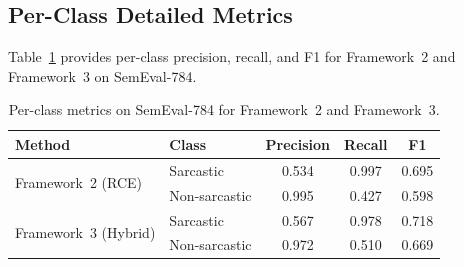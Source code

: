 \documentclass{article} %
\begin{document}
\subsection{Per-Class Detailed Metrics}

Table~\ref{tab:perclass} provides per-class precision, recall, and F1 for Framework~2 and Framework~3 on SemEval-784.

\begin{table}[h]
\centering
\small
\caption{Per-class metrics on SemEval-784 for Framework~2 and Framework~3.}
\label{tab:perclass}
\begin{tabular}{llccc}
\toprule
Method & Class & Precision & Recall & F1 \\
\midrule
\multirow{2}{*}{Framework~2 (RCE)}
    & Sarcastic      & 0.534 & 0.997 & 0.695 \\
    & Non-sarcastic  & 0.995 & 0.427 & 0.598 \\
\midrule
\multirow{2}{*}{Framework~3 (Hybrid)}
    & Sarcastic      & 0.567 & 0.978 & 0.718 \\
    & Non-sarcastic  & 0.972 & 0.510 & 0.669 \\
\bottomrule
\end{tabular}
\end{table}
\end{document}
